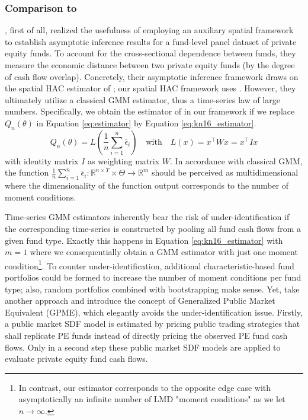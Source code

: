 \documentclass[12pt]{article}
\begin{document}
\subsubsection{Comparison to \cite{KN16}}

\cite{KN16}, first of all, realized the usefulness of employing an auxiliary spatial framework to establish asymptotic inference results for a fund-level panel dataset of private equity funds.
To account for the cross-sectional dependence between funds, they measure the economic distance between two private equity funds (by the degree of cash flow overlap).
Concretely, their asymptotic inference framework draws on the spatial HAC estimator of \cite{C99}; our spatial HAC framework uses \cite{PP97,KS11,JP12}.
However, they ultimately utilize a classical GMM estimator, thus a time-series law of large numbers.
Specifically, we obtain the estimator of \cite[Equation 18]{KN16} in our framework if we replace $Q_n(\theta)$ in Equation \ref{eq:estimator} by Equation \ref{eq:kn16_estimator}.
\begin{equation}
\label{eq:kn16_estimator}
Q_n(\theta) = 
L \left(
\frac{1}{n}
\sum_{i=1}^n
\bar{\epsilon}_{i} 
\right)
\quad
\mathrm{with}
\quad
L(x) = x^{\top} W x = x^{\top} I x
\end{equation}
with identity matrix $I$ as weighting matrix $W$.
In accordance with classical GMM, the function $\frac{1}{n} \sum_{i=1}^n \bar{\epsilon}_{i}: \mathbb{R}^{n \times T} \times \Theta \to \mathbb{R}^m$ should be perceived as multidimensional where the dimensionality of the function output corresponds to the number of moment conditions.

Time-series GMM estimators inherently bear the risk of under-identification if the corresponding time-series is constructed by pooling all fund cash flows from a given fund type.
Exactly this happens in Equation \ref{eq:kn16_estimator} with $m=1$ where we consequentially obtain a GMM estimator with just one moment condition\footnote{In contrast, our estimator corresponds to the opposite edge case with asymptotically an infinite number of LMD "moment conditions" as we let $n \to \infty$.}.
To counter under-identification, additional characteristic-based fund portfolios could be formed to increase the number of moment conditions per fund type; also, random portfolios combined with bootstrapping make sense.
Yet, \cite{KN16} take another approach and introduce the concept of Generalized Public Market Equivalent (GPME), which elegantly avoids the under-identification issue.
Firstly, a public market SDF model is estimated by pricing public trading strategies that shall replicate PE funds instead of directly pricing the observed PE fund cash flows.
Only in a second step these public market SDF models are applied to evaluate private equity fund cash flows.
\end{document}
